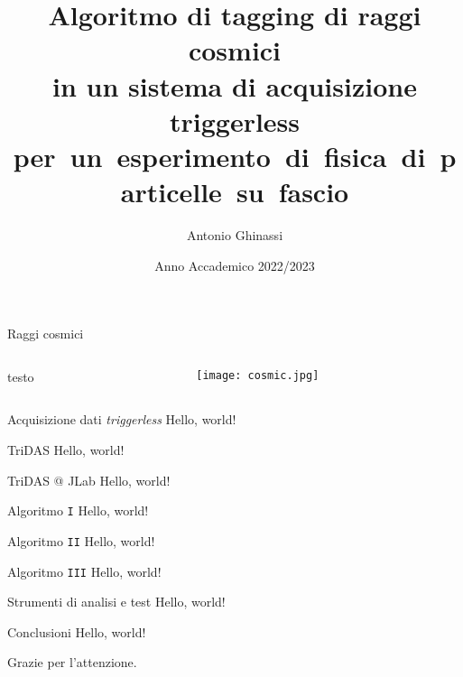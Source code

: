 \documentclass[aspectratio=169]{beamer}
\title{Algoritmo di tagging di raggi cosmici\\in un sistema di acquisizione triggerless\\\mbox{per un esperimento di fisica di particelle su fascio}}
\date{Anno Accademico 2022/2023}
\author{Antonio Ghinassi}
\institute{Alma Mater Studiorum $\cdot$ Università di Bologna}
\begin{document}
  \maketitle
  \begin{frame}{Raggi cosmici}
    
\begin{columns}[onlytextwidth,T]
  \begin{column}{.45\linewidth}
    testo
  \end{column}
  \begin{column}{.45\linewidth}
    \texttt{[image: cosmic.jpg]}
  \end{column}
\end{columns}

  \end{frame}
  \begin{frame}{Acquisizione dati \emph{triggerless}}
    Hello, world!
  \end{frame}
  \begin{frame}{TriDAS}
    Hello, world!
  \end{frame}
  \begin{frame}{TriDAS @ JLab}
    Hello, world!
  \end{frame}
  \begin{frame}{Algoritmo \texttt{I}}
    Hello, world!
  \end{frame}
  \begin{frame}{Algoritmo \texttt{II}}
    Hello, world!
  \end{frame}
  \begin{frame}{Algoritmo \texttt{III}}
    Hello, world!
  \end{frame}
  \begin{frame}{Strumenti di analisi e test}
    Hello, world!
  \end{frame}
  \begin{frame}{Conclusioni}
    Hello, world!
  \end{frame}
  \begin{frame}[standout]
      Grazie per l'attenzione.
  \end{frame}
\end{document}
